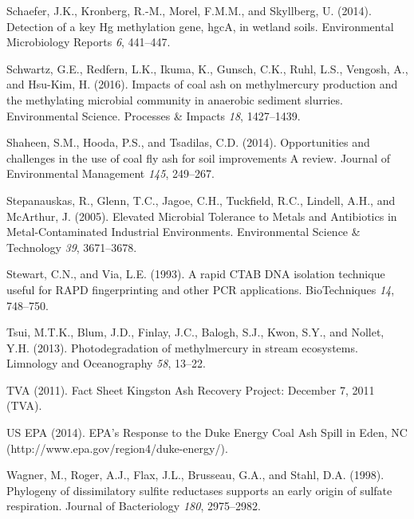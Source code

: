 \documentclass[ms, hidelinks]{uncgdissertationexp}
\theoremstyle{plain}
\theoremstyle{definition}
\theoremstyle{remark}
\begin{document}
\leavevmode\hypertarget{ref-schaeferDetectionKeyHg2014}{}%
Schaefer, J.K., Kronberg, R.-M., Morel, F.M.M., and Skyllberg, U. (2014). Detection of a key Hg methylation gene, hgcA, in wetland soils. Environmental Microbiology Reports \emph{6}, 441--447.

\leavevmode\hypertarget{ref-schwartzImpactsCoalAsh2016}{}%
Schwartz, G.E., Redfern, L.K., Ikuma, K., Gunsch, C.K., Ruhl, L.S., Vengosh, A., and Hsu-Kim, H. (2016). Impacts of coal ash on methylmercury production and the methylating microbial community in anaerobic sediment slurries. Environmental Science. Processes \& Impacts \emph{18}, 1427--1439.

\leavevmode\hypertarget{ref-shaheenOpportunitiesChallengesUse2014}{}%
Shaheen, S.M., Hooda, P.S., and Tsadilas, C.D. (2014). Opportunities and challenges in the use of coal fly ash for soil improvements A review. Journal of Environmental Management \emph{145}, 249--267.

\leavevmode\hypertarget{ref-stepanauskasElevatedMicrobialTolerance2005}{}%
Stepanauskas, R., Glenn, T.C., Jagoe, C.H., Tuckfield, R.C., Lindell, A.H., and McArthur, J. (2005). Elevated Microbial Tolerance to Metals and Antibiotics in Metal-Contaminated Industrial Environments. Environmental Science \& Technology \emph{39}, 3671--3678.

\leavevmode\hypertarget{ref-stewartRapidCTABDNA1993}{}%
Stewart, C.N., and Via, L.E. (1993). A rapid CTAB DNA isolation technique useful for RAPD fingerprinting and other PCR applications. BioTechniques \emph{14}, 748--750.

\leavevmode\hypertarget{ref-tsuiPhotodegradationMethylmercuryStream2013}{}%
Tsui, M.T.K., Blum, J.D., Finlay, J.C., Balogh, S.J., Kwon, S.Y., and Nollet, Y.H. (2013). Photodegradation of methylmercury in stream ecosystems. Limnology and Oceanography \emph{58}, 13--22.

\leavevmode\hypertarget{ref-tvaFactSheetKingston2011}{}%
TVA (2011). Fact Sheet Kingston Ash Recovery Project: December 7, 2011 (TVA).

\leavevmode\hypertarget{ref-usepaEPAResponseDuke2014}{}%
US EPA (2014). EPA's Response to the Duke Energy Coal Ash Spill in Eden, NC (http://www.epa.gov/region4/duke-energy/).

\leavevmode\hypertarget{ref-wagnerPhylogenyDissimilatorySulfite1998}{}%
Wagner, M., Roger, A.J., Flax, J.L., Brusseau, G.A., and Stahl, D.A. (1998). Phylogeny of dissimilatory sulfite reductases supports an early origin of sulfate respiration. Journal of Bacteriology \emph{180}, 2975--2982.
\end{document}
